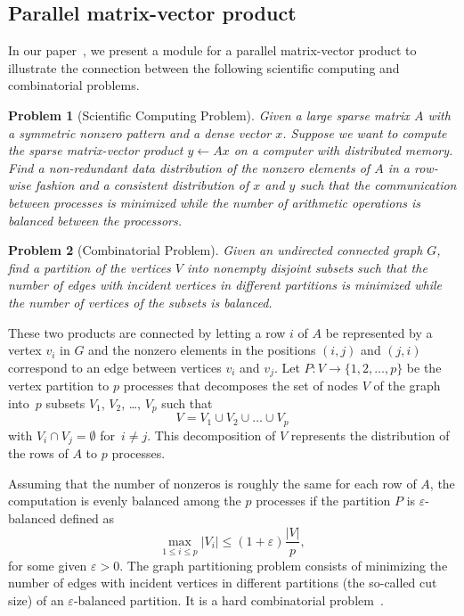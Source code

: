 \documentclass[12pt, twoside,a4paper,toc=bibliography]{scrbook}
\newtheorem{problem}{Problem}
\begin{document}
\subsection{Parallel matrix-vector product}
In our paper~\cite{2015:3}, we present a module for a parallel matrix-vector
product to illustrate the connection between the following scientific computing and combinatorial problems.
\begin{problem}[Scientific Computing Problem]
\label{p.par.mat.vec}
Given a large sparse matrix $A$ with a symmetric nonzero pattern and a dense
vector $x$. Suppose we want to compute the sparse matrix-vector product
$y \leftarrow Ax$ on a computer with distributed memory. Find a non-redundant
data distribution of the nonzero elements of $A$ in a row-wise fashion and a
consistent distribution of $x$ and $y$ such that the communication between
processes is minimized while the number of arithmetic operations is balanced
between the processors.
\end{problem}
\begin{problem}[Combinatorial Problem]
\label{p.par.mat.vec.graph}
Given an undirected connected graph $G$, find a partition of the vertices $V$ into
nonempty disjoint subsets such that the number of edges with incident vertices
in different partitions is minimized while the number of vertices of the subsets
is balanced.
\end{problem}
These two products are connected by letting a row $i$ of $A$ be represented by a vertex $v_i$
in $G$ and the nonzero elements in the positions $(i,j)$ and $(j,i)$ correspond to
an edge between vertices $v_i$ and $v_j$.
Let $P: V \rightarrow \{1, 2, \dots, p\}$ be the vertex partition to $p$ processes
that decomposes the set of nodes $V$ of the graph into~$p$ subsets $V_1$, $V_2$, \dots,
$V_p$ such that
$$
V = V_1 \cup V_2 \cup \dots \cup V_p
$$
with $V_i \cap V_j = \emptyset$ for~$i \neq j$. This decomposition of $V$ represents 
the distribution of the rows of $A$ to $p$ processes.

Assuming that the number of nonzeros is roughly the same for each row of $A$, the
computation is evenly balanced among the $p$ processes if the partition $P$ is
$\varepsilon$-balanced defined as
\begin{equation}\label{e.bal}
\max_{1 \leq i \leq p} |V_i| \leq (1 + \varepsilon) \frac{|V|}{p} ,
\end{equation}
for some given $\varepsilon > 0$. The graph partitioning problem consists of minimizing
the number of edges with incident vertices in different partitions (the so-called cut size) 
of an $\varepsilon$-balanced partition. It is a hard combinatorial problem~\cite{gj:com}.
\end{document}
